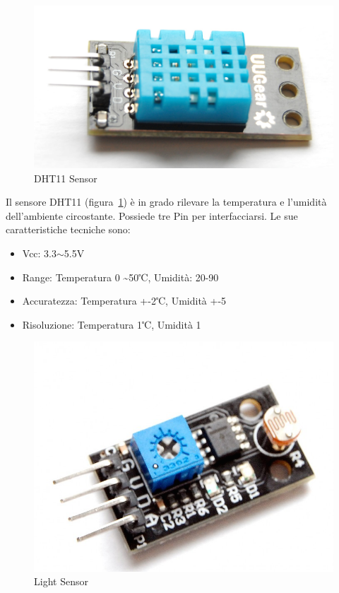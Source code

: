 \newpage

\begin{figure}
\centering
\includegraphics[width=0.7\linewidth]{Figures/Sensors&Rasp/dht11}
\caption[dht11]{DHT11 Sensor}
\label{fig:dht11}
\end{figure}

 Il sensore DHT11 (figura~\ref{fig:dht11}) \`e in grado rilevare la temperatura e l'umidità dell'ambiente circostante. Possiede tre Pin per interfacciarsi.
 Le sue caratteristiche tecniche sono:
 
 \begin{itemize}
 	\item Vcc: 3.3$\sim$5.5V
 	\item Range: Temperatura 0 \textasciitilde 50℃, Umidità:  20-90%
 	\item Accuratezza: Temperatura +-2℃, Umidit\`a +-5%
 	\item Risoluzione: Temperatura  1℃, Umidit\`a  1%
 \end{itemize}
 
 \newpage
 
\begin{figure}
	\centering
	\includegraphics[width=0.7\linewidth]{Figures/Sensors&Rasp/light}
	\caption[light]{Light Sensor}
	\label{fig:light}
\end{figure}


